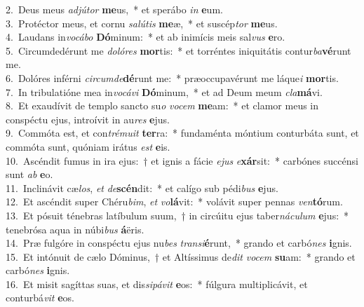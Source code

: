 {2.~}Deus meus \textit{ad}\textit{jú}\textit{tor} \textbf{me}us,~* et sperábo \textit{in} \textbf{e}um.\\
{3.~}Protéctor meus, et cornu \textit{sa}\textit{lú}\textit{tis} \textbf{me}æ,~* et suscép\textit{tor} \textbf{me}us.\\
{4.~}Laudans in\textit{vo}\textit{cá}\textit{bo} \textbf{Dó}minum:~* et ab inimícis meis sal\textit{vus} \textbf{e}ro.\\
{5.~}Circumdedérunt me \textit{do}\textit{ló}\textit{res} \textbf{mor}tis:~* et torréntes iniquitátis contur\textit{ba}\textbf{vé}runt me.\\
{6.~}Dolóres inférni \textit{cir}\textit{cum}\textit{de}\textbf{dé}runt me:~* præoccupavérunt me láque\textit{i} \textbf{mor}tis.\\
{7.~}In tribulatióne mea in\textit{vo}\textit{cá}\textit{vi} \textbf{Dó}minum,~* et ad Deum meum \textit{cla}\textbf{má}vi.\\
{8.~}Et exaudívit de templo sancto su\textit{o} \textit{vo}\textit{cem} \textbf{me}am:~* et clamor meus in conspéctu ejus, introívit in au\textit{res} \textbf{e}jus.\\
{9.~}Commóta est, et con\textit{tré}\textit{mu}\textit{it} \textbf{ter}ra:~* fundaménta móntium conturbáta sunt, et commóta sunt, quóniam irátus \textit{est} \textbf{e}is.\\
{10.~}Ascéndit fumus in ira ejus:~† et ignis a fácie \textit{e}\textit{jus} \textit{e}\textbf{xár}sit:~* carbónes succénsi sunt \textit{ab} \textbf{e}o.\\
{11.~}Inclinávit cæ\textit{los}, \textit{et} \textit{de}\textbf{scén}dit:~* et calígo sub pédi\textit{bus} \textbf{e}jus.\\
{12.~}Et ascéndit super Chéru\textit{bim}, \textit{et} \textit{vo}\textbf{lá}vit:~* volávit super pennas \textit{ven}\textbf{tó}rum.\\
{13.~}Et pósuit ténebras latíbulum suum,~† in circúitu ejus taber\textit{ná}\textit{cu}\textit{lum} \textbf{e}jus:~* tenebrósa aqua in núbi\textit{bus} \textbf{á}ëris.\\
{14.~}Præ fulgóre in conspéctu ejus nu\textit{bes} \textit{tran}\textit{si}\textbf{é}runt,~* grando et carbó\textit{nes} \textbf{i}gnis.\\
{15.~}Et intónuit de cælo Dóminus,~† et Altíssimus de\textit{dit} \textit{vo}\textit{cem} \textbf{su}am:~* grando et carbó\textit{nes} \textbf{i}gnis.\\
{16.~}Et misit sagíttas suas, et dis\textit{si}\textit{pá}\textit{vit} \textbf{e}os:~* fúlgura multiplicávit, et conturbá\textit{vit} \textbf{e}os.\\
